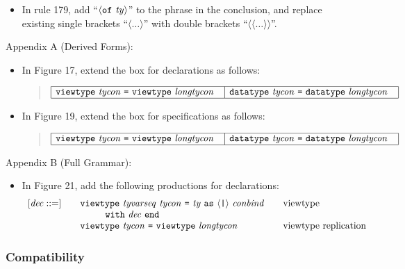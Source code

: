 \documentclass[twoside,titlepage]{article}
\begin{document}
\begin{appendix}
\begin{itemize}
\item In rule 179, add ``$\langle{\tt{of}}~\mathit{ty}\rangle$'' to the phrase in the conclusion, and replace existing single brackets ``$\langle\dots\rangle$'' with double brackets  ``$\langle\langle\dots\rangle\rangle$''.
\end{itemize}

Appendix A (Derived Forms):
\begin{itemize}
\item In Figure 17, extend the box for declarations as follows:
  \begin{quote}
  $\begin{array}{|l|l|}
  \hline
  {\tt{viewtype}}~\mathit{tycon}~\mbox{\tt=}~{\tt{viewtype}}~\mathit{longtycon}~~
  & {\tt{datatype}}~\mathit{tycon}~\mbox{\tt=}~{\tt{datatype}}~\mathit{longtycon}~~ \\
  \hline
  \end{array}$
  \end{quote}

\item In Figure 19, extend the box for specifications as follows:
  \begin{quote}
  $\begin{array}{|l|l|}
  \hline
  {\tt{viewtype}}~\mathit{tycon}~\mbox{\tt=}~{\tt{viewtype}}~\mathit{longtycon}~~
  & {\tt{datatype}}~\mathit{tycon}~\mbox{\tt=}~{\tt{datatype}}~\mathit{longtycon}~~ \\
  \hline
  \end{array}$
  \end{quote}
\end{itemize}

Appendix B (Full Grammar):
\begin{itemize}
\item In Figure 21, add the following productions for declarations:
  $$
  \begin{array}{l@{\qquad}l@{\qquad}l}
  [\mathit{dec} ::=] & {\tt{viewtype}}~\mathit{tyvarseq}~\mathit{tycon}~\mbox{\tt=}~\mathit{ty}~{\tt{as}}~\langle\mbox{\tt|}\rangle~\mathit{conbind} & \textrm{viewtype} \\
  & ~~~~~~~~{\tt{with}}~\mathit{dec}~{\tt{end}} \\
  & {\tt{viewtype}}~\mathit{tycon}~\mbox{\tt=}~{\tt{viewtype}}~\mathit{longtycon} & \textrm{viewtype replication}
  \end{array}
  $$
\end{itemize}

\subsubsection*{Compatibility}


\end{appendix}
\end{document}
